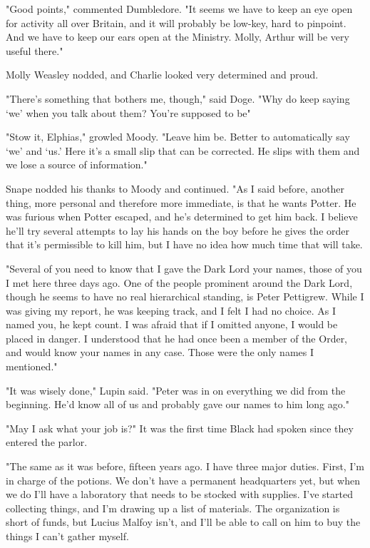 "Good points," commented Dumbledore. "It seems we have to keep an eye open for activity all over Britain, and it will probably be low-key, hard to pinpoint. And we have to keep our ears open at the Ministry. Molly, Arthur will be very useful there."

Molly Weasley nodded, and Charlie looked very determined and proud.

"There's something that bothers me, though," said Doge. "Why do keep saying `we' when you talk about them? You're supposed to be{\el}"

"Stow it, Elphias," growled Moody. "Leave him be. Better to automatically say `we' and `us.' Here it's a small slip that can be corrected. He slips with them and we lose a source of information."

Snape nodded his thanks to Moody and continued. "As I said before, another thing, more personal and therefore more immediate, is that he wants Potter. He was furious when Potter escaped, and he's determined to get him back. I believe he'll try several attempts to lay his hands on the boy before he gives the order that it's permissible to kill him, but I have no idea how much time that will take.

"Several of you need to know that I gave the Dark Lord your names, those of you I met here three days ago. One of the people prominent around the Dark Lord, though he seems to have no real hierarchical standing, is Peter Pettigrew. While I was giving my report, he was keeping track, and I felt I had no choice. As I named you, he kept count. I was afraid that if I omitted anyone, I would be placed in danger. I understood that he had once been a member of the Order, and would know your names in any case. Those were the only names I mentioned."

"It was wisely done," Lupin said. "Peter was in on everything we did from the beginning. He'd know all of us and probably gave our names to{\el} him long ago."

"May I ask what your job is?" It was the first time Black had spoken since they entered the parlor.

"The same as it was before, fifteen years ago. I have three major duties. First, I'm in charge of the potions. We don't have a permanent headquarters yet, but when we do I'll have a laboratory that needs to be stocked with supplies. I've started collecting things, and I'm drawing up a list of materials. The organization is short of funds, but Lucius Malfoy isn't, and I'll be able to call on him to buy the things I can't gather myself.

